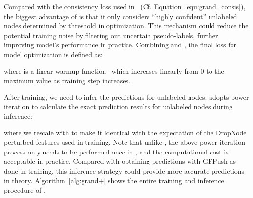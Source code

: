Compared with the consistency loss used in \grand\ (Cf. Equation~\ref{equ:grand_consis}), the biggest advantage of  is that it only considers ``highly confident'' unlabeled nodes determined by threshold  in optimization. This mechanism could reduce the potential training noise by filtering out uncertain pseudo-labels, further improving model's performance in practice. Combining  and , the final loss for model optimization is defined as:



where  is a linear warmup function~\cite{goyal2017accurate} which increases linearly from 0 to the maximum value  as training step  increases. 


After training, we need to infer the predictions for  unlabeled nodes. \model adopts power iteration to calculate the exact prediction results for unlabeled nodes during inference:

where we rescale  with   to make it identical with the expectation of the DropNode perturbed features used in training. 
Note that unlike \grand, the above power iteration process only needs to be performed once in \model, and the computational cost is acceptable in practice. 
Compared with obtaining predictions with GFPush as done in training, this inference strategy could provide more accurate predictions in theory.
Algorithm~\ref{alg:grand+} shows the entire training and inference procedure of \model.









\hide{

}


